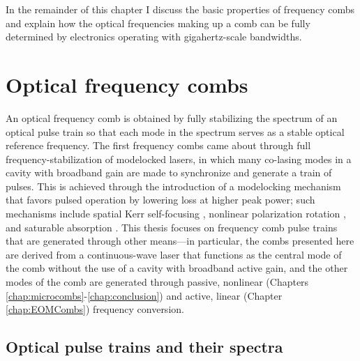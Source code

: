 In the remainder of this chapter I discuss the basic properties of frequency combs and explain how the optical frequencies making up a comb can be fully determined by electronics operating with gigahertz-scale bandwidths.

\section{Optical frequency combs}

An optical frequency comb is obtained by fully stabilizing the spectrum of an optical pulse train so that each mode in the spectrum serves as a stable optical reference frequency. The first frequency combs came about through full frequency-stabilization of modelocked lasers, in which many co-lasing modes in a cavity with broadband gain are made to synchronize and generate a train of pulses. This is achieved through the introduction of a modelocking mechanism that favors pulsed operation by lowering loss at higher peak power; such mechanisms include spatial Kerr self-focusing \cite{Spence1991,Brabec1992}, nonlinear polarization rotation \cite{Hofer1992,Fermann1993}, and saturable absorption \cite{Stankov1988}. This thesis focuses on frequency comb pulse trains that are generated through other means---in particular, the combs presented here are derived from a continuous-wave laser that functions as the central mode of the comb without the use of a cavity with broadband active gain, and the other modes of the comb are generated through passive, nonlinear (Chapters \ref{chap:microcombs}-\ref{chap:conclusion}) and active, linear (Chapter \ref{chap:EOMCombs}) frequency conversion.

\subsection{Optical pulse trains and their spectra}

